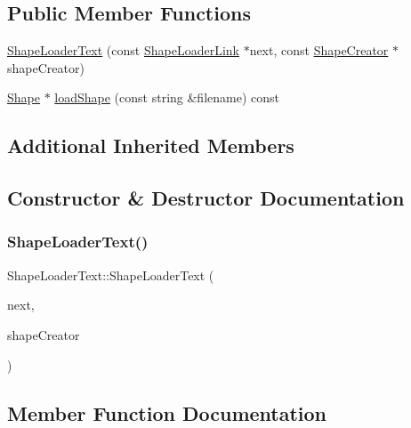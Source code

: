 \subsection*{Public Member Functions}
\begin{DoxyCompactItemize}
\item 
\hyperlink{class_shape_loader_text_ac2bbc1cc5d177966949935a008016b57}{Shape\+Loader\+Text} (const \hyperlink{class_shape_loader_link}{Shape\+Loader\+Link} $\ast$next, const \hyperlink{class_shape_creator}{Shape\+Creator} $\ast$shape\+Creator)
\item 
\hyperlink{class_shape}{Shape} $\ast$ \hyperlink{class_shape_loader_text_a7770dff8a2b7c942e2fdf5b5c15b5748}{load\+Shape} (const string \&filename) const
\end{DoxyCompactItemize}
\subsection*{Additional Inherited Members}


\subsection{Constructor \& Destructor Documentation}
\hypertarget{class_shape_loader_text_ac2bbc1cc5d177966949935a008016b57}{}\label{class_shape_loader_text_ac2bbc1cc5d177966949935a008016b57} 
\subsubsection{\texorpdfstring{Shape\+Loader\+Text()}{ShapeLoaderText()}}
{\footnotesize\ttfamily Shape\+Loader\+Text\+::\+Shape\+Loader\+Text (\begin{DoxyParamCaption}\item[{const \hyperlink{class_shape_loader_link}{Shape\+Loader\+Link} $\ast$}]{next,  }\item[{const \hyperlink{class_shape_creator}{Shape\+Creator} $\ast$}]{shape\+Creator }\end{DoxyParamCaption})}



\subsection{Member Function Documentation}
\hypertarget{class_shape_loader_text_a7770dff8a2b7c942e2fdf5b5c15b5748}{}\label{class_shape_loader_text_a7770dff8a2b7c942e2fdf5b5c15b5748} 
